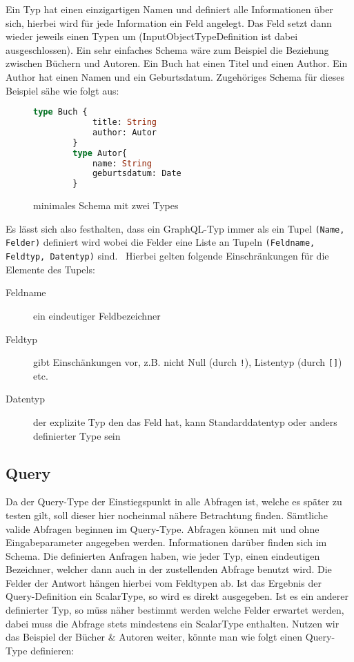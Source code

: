 Ein Typ hat einen einzigartigen Namen und definiert alle Informationen über sich, hierbei wird für jede Information ein Feld angelegt.
Das Feld setzt dann wieder jeweils einen Typen um (InputObjectTypeDefinition ist dabei ausgeschlossen).
Ein sehr einfaches Schema wäre zum Beispiel die Beziehung zwischen Büchern und Autoren.
Ein Buch hat einen Titel und einen Author.
Ein Author hat einen Namen und ein Geburtsdatum.
Zugehöriges Schema für dieses Beispiel sähe wie folgt aus:

\begin{figure}[htb]
    \begin{center}
        \begin{lstlisting}[language=GraphQL]
        type Buch {
            title: String
            author: Autor
        }
        type Autor{
            name: String
            geburtsdatum: Date
        }
        \end{lstlisting}
    \end{center}
    \caption{minimales Schema mit zwei Types}
    \label{buchauthorschema}
\end{figure}

Es lässt sich also festhalten, dass ein GraphQL-Typ immer als ein Tupel \verb+(Name, Felder)+ definiert wird wobei
die Felder eine Liste an Tupeln \verb+(Feldname, Feldtyp, Datentyp)+ sind.~\cite[vgl. 3.6 Objects]{graphqlspecification}
\newpage
Hierbei gelten folgende Einschränkungen für die Elemente des Tupels:

\begin{center}
    \begin{description}
        \item[Feldname] ein eindeutiger Feldbezeichner
        \item[Feldtyp] gibt Einschänkungen vor, z.B. nicht Null (durch \verb+!+), Listentyp (durch \verb+[]+) etc.
        \item[Datentyp] der explizite Typ den das Feld hat, kann Standarddatentyp oder anders definierter Type sein
    \end{description}
\end{center}

\subsection{Query}

Da der Query-Type der Einstiegspunkt in alle Abfragen ist, welche es später zu testen gilt, soll dieser hier nocheinmal nähere Betrachtung finden.
Sämtliche valide Abfragen beginnen im Query-Type.
Abfragen können mit und ohne Eingabeparameter angegeben werden.
Informationen darüber finden sich im Schema.
Die definierten Anfragen haben, wie jeder Typ, einen eindeutigen Bezeichner, welcher dann auch in der zustellenden Abfrage
benutzt wird.
Die Felder der Antwort hängen hierbei vom Feldtypen ab.
Ist das Ergebnis der Query-Definition ein ScalarType, so wird es direkt ausgegeben.
Ist es ein anderer definierter Typ, so müss näher bestimmt werden welche Felder erwartet werden, dabei muss die Abfrage stets mindestens ein ScalarType enthalten.
Nutzen wir das Beispiel der Bücher \& Autoren weiter, könnte man wie folgt einen Query-Type definieren:

